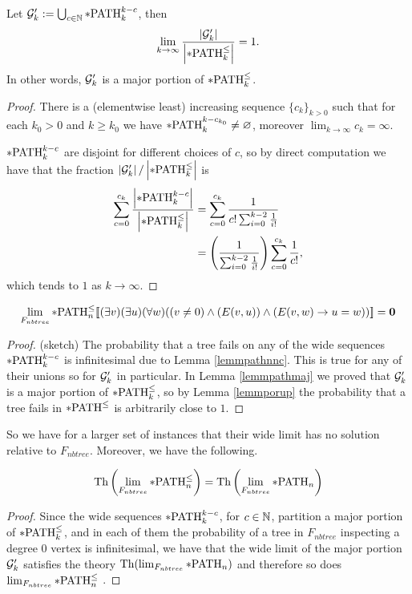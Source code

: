 \begin{lemm}\label{lemmpathmaj}
Let $\mathcal{G}_k':=\bigcup_{c\in\mathbb{N}}*\text{PATH}^{k-c}_k$, then
\[\lim_{k\to\infty}\frac{\left|{\mathcal{G}_k'}\right|}{\left|{*\text{PATH}^\leq_k}\right|}=1.\]
In other words, $\mathcal{G}_k'$ is a major portion of $*\text{PATH}^\leq_k$.
\end{lemm}
\begin{proof}
There is a (elementwise least) increasing sequence $\{c_k\}_{k>0}$ such that for each $k_0>0$ and $k\geq k_0$ we have $*\text{PATH}_k^{k-{c_{k_0}}}\neq \varnothing$, moreover $\lim_{k\to\infty} c_k = \infty$.

$*\text{PATH}^{k-c}_k$ are disjoint for different choices of $c$, so by direct computation we have that the fraction $\left|{\mathcal{G}_k'}\right|/\left|{*\text{PATH}^\leq_k}\right|$ is
\begin{align}
\sum_{c=0}^{c_k} \frac{\left|{*\text{PATH}_k^{k-c}}\right|}{\left|{*\text{PATH}^\leq_k}\right|}&=\sum_{c=0}^{c_k}\frac{1}{c!\sum_{i=0}^{k-2}\frac{1}{i!}}\\
&=\left(\frac{1}{\sum_{i=0}^{k-2}\frac{1}{i!}}\right)\sum_{c=0}^{c_k}\frac{1}{c!},
\end{align}
which tends to $1$ as $k\to\infty$.
\end{proof}

\begin{thrm}
\[\lim_{F_{nbtree}}*\text{PATH}^\leq_n[\![(\exists v)(\exists u)(\forall w)((v\not=0)\land (E(v,u)) \land(E(v,w) \to u=w))]\!]=\textbf{0}\]
\end{thrm}
\begin{proof}(sketch)
The probability that a tree fails on any of the wide sequences $*\text{PATH}_k^{k-c}$ is infinitesimal due to Lemma \ref{lemmpathnnc}. This is true for any of their unions so for $\mathcal{G}_k'$ in particular. In Lemma \ref{lemmpathmaj} we proved that $\mathcal{G}_k'$ is a major portion of $*\text{PATH}^\leq_k$, so by Lemma \ref{lemmporup} the probability that a tree fails in $*\text{PATH}^\leq$ is arbitrarily close to $1$.
\end{proof}

So we have for a larger set of instances that their wide limit has no solution relative to $F_{nbtree}$. Moreover, we have the following.

\begin{crll}\label{crllpPATHl}
\[\text{Th}\left(\lim_{F_{nbtree}}*\text{PATH}^\leq_n\right)=\text{Th}\left(\lim_{F_{nbtree}}*\text{PATH}_n\right)\]
\end{crll}
\begin{proof}
Since the wide sequences $*\text{PATH}_k^{k-c}$, for $c\in\mathbb{N}$, partition a major portion of $*\text{PATH}^\leq_k$, and in each of them the probability of a tree in $F_{nbtree}$ inspecting a degree 0 vertex is infinitesimal, we have that the wide limit of the major portion $\mathcal{G}_k'$ satisfies the theory $\text{Th}(\lim_{F_{nbtree}}*\text{PATH}_n)$ and therefore so does $\lim_{F_{nbtree}}*\text{PATH}^\leq_n$ .
\end{proof}



